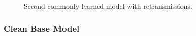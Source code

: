 \begin{figure}[ht]
	\vspace*{\fill}
	\noindent
	\hspace*{-2.1\oddsidemargin}%
	\caption{Second commonly learned model with retransmissions.}
	\label{fig:ret_case2}
	\vspace*{\fill}
\end{figure}
\newpage

\subsubsection*{Clean Base Model}

